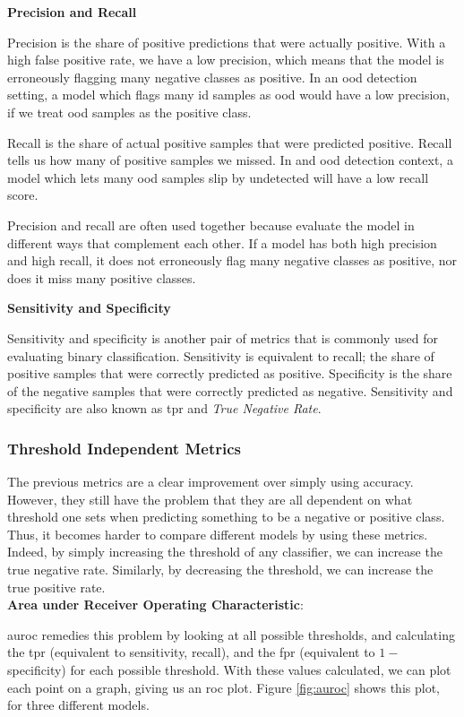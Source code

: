 \documentclass[UKenglish]{uiomasterthesis} %
\theoremstyle{definition}
\begin{document}
\noindent \textbf{Precision and Recall}

\noindent Precision is the share of positive predictions that were actually positive. With a high false positive rate, we have a low precision, which means that the model is erroneously flagging many negative classes as positive. In an \ac{ood} detection setting, a model which flags many \ac{id} samples as \ac{ood} would have a low precision, if we treat \ac{ood} samples as the positive class.

Recall is the share of actual positive samples that were predicted positive. Recall tells us how many of positive samples we missed. In and \ac{ood} detection context, a model which lets many \ac{ood} samples slip by undetected will have a low recall score.

Precision and recall are often used together because evaluate the model in different ways that complement each other. If a model has both high precision and high recall, it does not erroneously flag many negative classes as positive, nor does it miss many positive classes.

\noindent \textbf{Sensitivity and Specificity}

\noindent Sensitivity and specificity is another pair of metrics that is commonly used for evaluating binary classification. Sensitivity is equivalent to recall; the share of positive samples that were correctly predicted as positive. Specificity is the share of the negative samples that were correctly predicted as negative. Sensitivity and specificity are also known as \ac{tpr} and {\it True Negative Rate}.

\subsubsection{Threshold Independent Metrics}

The previous metrics are a clear improvement over simply using accuracy. However, they still have the problem that they are all dependent on what threshold one sets when predicting something to be a negative or positive class. Thus, it becomes harder to compare different models by using these metrics. Indeed, by simply increasing the threshold of any classifier, we can increase the true negative rate. Similarly, by decreasing the threshold, we can increase the true positive rate.\\

\noindent \textbf{Area under Receiver Operating Characteristic}:

\noindent \ac{auroc} remedies this problem by looking at all possible thresholds, and calculating the \ac{tpr} (equivalent to sensitivity, recall), and the \ac{fpr} (equivalent to $1 -$ specificity) for each possible threshold. With these values calculated, we can plot each point on a graph, giving us an \ac{roc} plot. Figure \ref{fig:auroc} shows this plot, for three different models.
\end{document}
